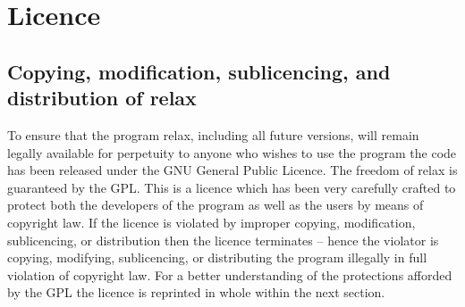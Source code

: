 


\chapter{Licence}



\section{Copying, modification, sublicencing, and distribution of relax}

To ensure that the program relax, including all future versions, will remain legally available for perpetuity to anyone who wishes to use the program the code has been released under the GNU General Public Licence.
The freedom of relax is guaranteed by the GPL.
This is a licence which has been very carefully crafted to protect both the developers of the program as well as the users by means of copyright law.
If the licence is violated by improper copying, modification, sublicencing, or distribution then the licence terminates -- hence the violator is copying, modifying, sublicencing, or distributing the program illegally in full violation of copyright law.
For a better understanding of the protections afforded by the GPL the licence is reprinted in whole within the next section.


